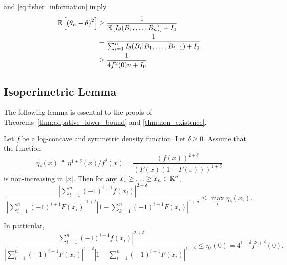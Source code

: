 \cite{van2004detection} and \eqref{eq:fisher_information} imply
\begin{align*}
\mathbb{E}\left[  \left( \theta_n - \theta \right)^2\right] &  \geq \frac{1}{ \mathbb{E}\left[  I_\theta(B_1,\ldots,B_n)\right] + I_0} \\
& = \frac{1}{ \sum_{i=1}^n I_\theta (B_i | B_1,\ldots,B_{i-1}) + I_0} \\
& \geq \frac{1}{ 4f^2(0) n + I_0}.
\end{align*}

\subsection{Isoperimetric Lemma}
\label{sec:bound_intervals_delta}

The following lemma is essential to the proofs
of Theorems~\ref{thm:adpative_lower_bound} and
\ref{thm:non_existence}.

\begin{lem}
  \label{lem:bound_intervals_delta}
  Let $f$ be a log-concave and symmetric density
  function. Let $\delta\geq 0$. Assume that the function
  \begin{equation*}
    \eta_\delta(x) \triangleq  \eta^{1+\delta}(x)/f^\delta(x)
    = \frac{  \left( f(x) \right)^{2+\delta}}{\left(F(x)(1-F(x))\right)^{1+\delta}}
  \end{equation*}
  is non-increasing in $|x|$. Then for any $x_1 \ge \ldots \ge x_n \in \mathbb{R}^n$,
  \begin{equation}
    \frac{ \left| \sum_{i=1}^n (-1)^{i+1} f(x_i) \right|^{2+\delta} } {\left|
      \sum_{i=1}^n (-1)^{i+1} F(x_i) \right|^{1+\delta} \left|1- \sum_{k=1}^n
      (-1)^{i+1} F(x_i) \right|^{1+\delta} } \leq \max_{i} \eta_\delta(x_i).
    \label{eq:lem_bound_intervals_delta}
  \end{equation}
\end{lem}
In particular, 
\begin{equation*}
\frac{ \left| \sum_{i=1}^n (-1)^{i+1} f(x_i) \right|^{2+\delta} }
{\left| \sum_{i=1}^n (-1)^{i+1} F(x_i) \right|^{1+\delta} \left|1- \sum_{i=1}^n (-1)^{i+1} F(x_i) \right|^{1+\delta} } 
\leq \eta_\delta(0) = 4^{1+\delta} f^{2+\delta}(0).
\end{equation*}

